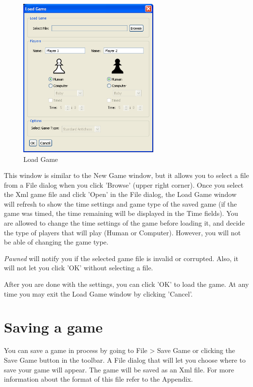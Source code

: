 \documentclass{report}
\begin{document}
				\begin{figure}
					\begin{center}
						\includegraphics[width=200pt]{img/load-game-1.png}
							\caption{Load Game}						
					\end{center}
				\end{figure}
			
			This window is similar to the New Game window, but it allows you to select a
			file from a File dialog when you click 'Browse' (upper right corner).
			Once you select the Xml game file and click 'Open' in the File dialog,
			the Load Game window will refresh to show the time settings and game type of 
			the saved game (if the game was timed, the time remaining will be displayed
			in the Time fields). You are allowed to change the time settings of the game
			before loading it, and decide the type of players that will play (Human or 
			Computer). However, you will not be able of changing the game type. 
			
			\emph{Pawned} will notify you if the selected game file is invalid or 
			corrupted. Also, it will not let you click 'OK' without selecting a file.
			
			After you are done with the settings, you can click 'OK' to load the game. At 
			any time you may exit the Load Game window by clicking 'Cancel'.
			
			\section{Saving a game}
			
			You can save a game in process by going to File > Save Game or clicking the 
			Save Game button in the toolbar. A File dialog that will let you choose where 
			to save your game will appear. The game will be saved as an Xml file. For
			more information about the format of this file refer to the Appendix. 
			
\end{document}

